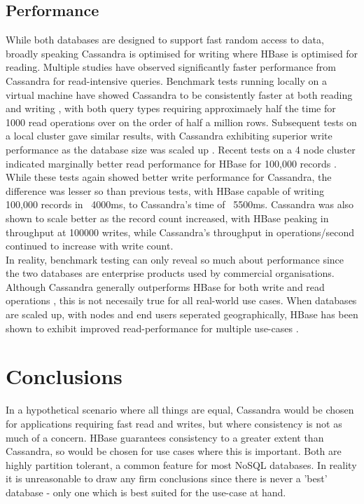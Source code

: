 \documentclass[10pt]{article}
\begin{document}
\subsection{Performance}
While both databases are designed to support fast random access to data, broadly speaking Cassandra is optimised for writing where HBase is optimised for reading. Multiple studies have observed significantly faster performance from Cassandra for read-intensive queries. Benchmark tests running locally on a virtual machine have showed Cassandra to be consistently faster at both reading and writing \cite{abrberfur2014}, with both query types requiring approximaely half the time for 1000 read operations over on the order of half a million rows. Subsequent tests on a local cluster gave similar results, with Cassandra exhibiting superior write performance as the database size was scaled up \cite{7507964}. Recent tests on a 4 node cluster indicated marginally better read performance for HBase for 100,000 records \cite{7979888}. While these tests again showed better write performance for Cassandra, the difference was lesser so than previous tests, with HBase capable of writing 100,000 records in ~4000ms, to Cassandra's time of ~5500ms. Cassandra was also shown to scale better as the record count increased, with HBase peaking in throughput at 100000 writes, while Cassandra's throughput in operations/second continued to increase with write count.\\

In reality, benchmark testing can only reveal so much about performance since the two databases are enterprise products used by commercial organisations. Although Cassandra generally outperforms HBase for both write and read operations \cite{DBLP:journals/corr/abs-1208-4167}, this is not necesaily true for all real-world use cases. When databases are scaled up, with nodes and end users seperated geographically, HBase has been shown to exhibit improved read-performance for multiple use-cases \cite{xu2017}.


\section{Conclusions}
In a hypothetical scenario where all things are equal, Cassandra would be chosen for applications requiring fast read and writes, but where consistency is not as much of a concern. HBase guarantees consistency to a greater extent than Cassandra, so would be chosen for use cases where this is important. Both are highly partition tolerant, a common feature for most NoSQL databases. In reality it is unreasonable to draw any firm conclusions since there is never a 'best' database - only one which is best suited for the use-case at hand.
\end{document}
